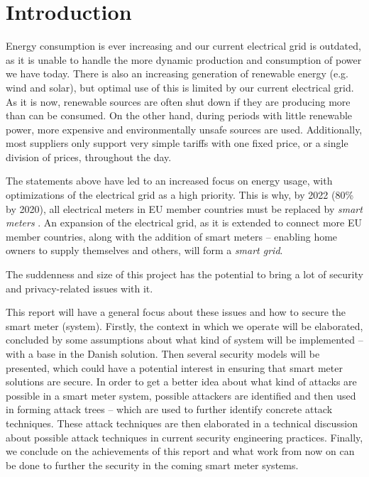 
\chapter*{Introduction}

Energy consumption is ever increasing and our current electrical grid is outdated, as it is unable to handle the more dynamic production and consumption of power we have today.
There is also an increasing generation of renewable energy (e.g. wind and solar), but optimal use of this is limited by our current electrical grid.
As it is now, renewable sources are often shut down if they are producing more than can be consumed.
On the other hand, during periods with little renewable power, more expensive and environmentally unsafe sources are used.
Additionally, most suppliers only support very simple tariffs with one fixed price, or a single division of prices, throughout the day.

The statements above have led to an increased focus on energy usage, with optimizations of the electrical grid as a high priority.
This is why, by 2022 (80\% by 2020), all  electrical meters in EU member countries must be replaced by \emph{smart meters} \cite{smart_meter_survey, directive_2009_72_EC}.
An expansion of the electrical grid, as it is extended to connect more EU member countries, along with the addition of smart meters -- enabling home owners to supply themselves and others, will form a \emph{smart grid}.

The suddenness and size of this project has the potential to bring a lot of security and privacy-related issues with it.

This report will have a general focus about these issues and how to secure the smart meter (system).
Firstly, the context in which we operate will be elaborated, concluded by some assumptions about what kind of system will be implemented -- with a base in the Danish solution.
Then several security models will be presented, which could have a potential interest in ensuring that smart meter solutions are secure.
In order to get a better idea about what kind of attacks are possible in a smart meter system, possible attackers are identified and then used in forming attack trees -- which are used to further identify concrete attack techniques.
These attack techniques are then elaborated in a technical discussion about possible attack techniques in current security engineering practices.
Finally, we conclude on the achievements of this report and what work from now on can be done to further the security in the coming smart meter systems.
